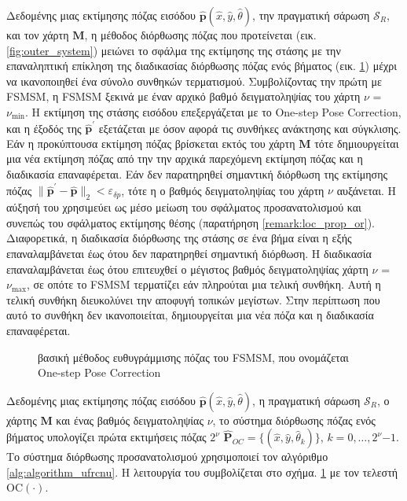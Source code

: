 Δεδομένης μιας εκτίμησης πόζας εισόδου $\hat{\bm{p}}(\hat{x}, \hat{y},
\hat{\theta})$, την πραγματική σάρωση $\mathcal{S}_R$, και τον χάρτη $\bm{M}$,
η μέθοδος διόρθωσης πόζας που προτείνεται (εικ. \ref{fig:outer_system}) μειώνει
το σφάλμα της εκτίμησης της στάσης με την επαναληπτική επίκληση της διαδικασίας
διόρθωσης πόζας ενός βήματος (εικ.  \ref{fig:inner_system}) μέχρι να
ικανοποιηθεί ένα σύνολο συνθηκών τερματισμού. Συμβολίζοντας την πρώτη με FSMSM,
η FSMSM ξεκινά με έναν αρχικό βαθμό δειγματοληψίας του χάρτη $\nu$ =
$\nu_{\min}$. Η εκτίμηση της στάσης εισόδου επεξεργάζεται με το One-step Pose
Correction, και η έξοδός της $\hat{\bm{p}}^\prime$ εξετάζεται με όσον αφορά τις
συνθήκες ανάκτησης και σύγκλισης. Εάν η προκύπτουσα εκτίμηση πόζας βρίσκεται
εκτός του χάρτη $\bm{M}$ τότε δημιουργείται μια νέα εκτίμηση πόζας από την την
αρχικά παρεχόμενη εκτίμηση πόζας και η διαδικασία επαναφέρεται. Εάν δεν
παρατηρηθεί σημαντική διόρθωση της εκτίμησης πόζας
$\|\hat{\bm{p}}^\prime-\hat{\bm{p}}\|_2 < \varepsilon_{\delta p}$, τότε η ο
βαθμός δειγματοληψίας του χάρτη $\nu$ αυξάνεται. Η αύξησή του χρησιμεύει ως
μέσο μείωση του σφάλματος προσανατολισμού και συνεπώς του σφάλματος εκτίμησης
θέσης (παρατήρηση \ref{remark:loc_prop_or}). Διαφορετικά, η διαδικασία
διόρθωσης της στάσης σε ένα βήμα είναι η εξής επαναλαμβάνεται έως ότου δεν
παρατηρηθεί σημαντική διόρθωση. Η διαδικασία επαναλαμβάνεται έως ότου
επιτευχθεί ο μέγιστος βαθμός δειγματοληψίας χάρτη $\nu$ = $\nu_{\max}$, σε
οπότε το FSMSM τερματίζει εάν πληρούται μια τελική συνθήκη. Αυτή η τελική
συνθήκη διευκολύνει την αποφυγή τοπικών μεγίστων. Στην περίπτωση που αυτό το
συνθήκη δεν ικανοποιείται, δημιουργείται μια νέα πόζα και η διαδικασία
επαναφέρεται.

\begin{figure}[]\centering
  
  \caption{\small  βασική μέθοδος ευθυγράμμισης πόζας του FSMSM, που ονομάζεται
           One-step Pose Correction}
  \label{fig:inner_system}
\end{figure}


Δεδομένης μιας εκτίμησης πόζας εισόδου $\hat{\bm{p}}(\hat{x}, \hat{y},
\hat{\theta})$, η πραγματική σάρωση $\mathcal{S}_R$, ο χάρτης $\bm{M}$ και ένας
βαθμός δειγματοληψίας $\nu$, το σύστημα διόρθωσης πόζας ενός βήματος υπολογίζει
πρώτα εκτιμήσεις πόζας $2^\nu$ $\hat{\bm{P}}_{OC} = \{(\hat{x}, \hat{y},
\hat{\theta}_k)\}$, $k = 0,\dots,2^\nu$$-$$1$. Το σύστημα διόρθωσης
προσανατολισμού χρησιμοποιεί τον αλγόριθμο \ref{alg:algorithm_ufrcnu}. Η
λειτουργία του συμβολίζεται στο σχήμα.  \ref{fig:inner_system} με τον τελεστή
OC$(\cdot)$.


